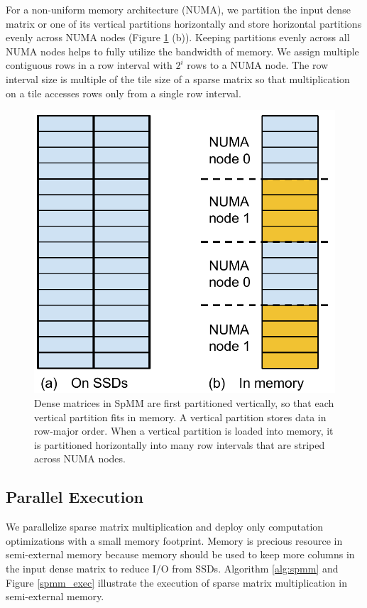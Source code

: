 For a non-uniform memory architecture (NUMA), we partition the input dense matrix
or one of its vertical partitions horizontally and store horizontal partitions
evenly across NUMA nodes (Figure \ref{dense_mat} (b)). Keeping partitions evenly
across all NUMA nodes helps to fully utilize the bandwidth of memory.
We assign multiple contiguous rows in a row interval with $2^i$ rows to
a NUMA node. The row interval size is multiple of the tile size of
a sparse matrix so that multiplication on a tile accesses rows only
from a single row interval.

\begin{figure}
\centering
\includegraphics[scale=0.4]{SpMM_figs/dense_matrix.pdf}
\caption{Dense matrices in SpMM are first partitioned
vertically, so that each vertical partition fits in memory. A vertical
partition stores data in row-major order. When a vertical partition is loaded
into memory, it is partitioned horizontally into many row intervals that
are striped across NUMA nodes.}
\label{dense_mat}
\end{figure}

\subsection{Parallel Execution} \label{sec:exec}
We parallelize sparse matrix multiplication and deploy only computation
optimizations with a small memory footprint. Memory is precious resource
in semi-external memory because memory should be used to keep more columns
in the input dense matrix to reduce I/O from SSDs.
Algorithm \ref{alg:spmm} and Figure \ref{spmm_exec} illustrate the execution of
sparse matrix multiplication in semi-external memory.

